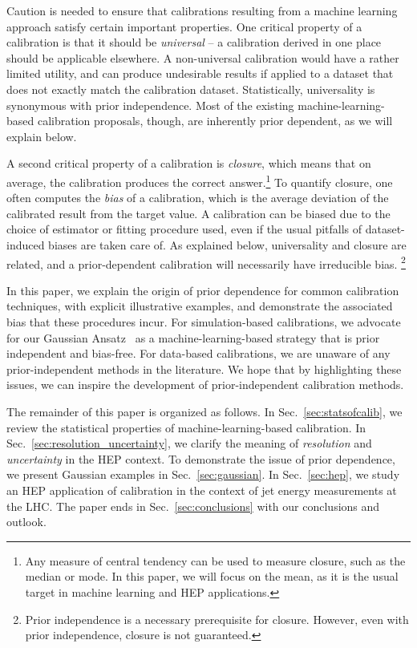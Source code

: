 \documentclass[aps,prd,reprint,preprintnumbers,superscriptaddress,nofootinbib,longbibliography,floatfix]{revtex4-1}
\DeclareRobustCommand{\Sec}[1]{Sec.~\ref{sec:#1}}
\begin{document}
Caution is needed to ensure that calibrations resulting from a machine learning approach satisfy certain important properties.
%
One critical property of a calibration is that it should be \textit{universal} -- a calibration derived in one place should be applicable elsewhere.
%
A non-universal calibration would have a rather limited utility, and can produce undesirable results if applied to a dataset that does not exactly match the calibration dataset.
%
Statistically, universality is synonymous with prior independence.
%
Most of the existing machine-learning-based calibration proposals, though, are inherently prior dependent, as we will explain below.


A second critical property of a calibration is \textit{closure}, which means that on average, the calibration produces the correct answer.\footnote{Any measure of central tendency can be used to measure closure, such as the median or mode. In this paper, we will focus on the mean, as it is the usual target in machine learning and HEP applications.}
%
To quantify closure, one often computes the \emph{bias} of a calibration, which is the average deviation of the calibrated result from the target value.
% 
A calibration can be biased due to the choice of estimator or fitting procedure used, even if the usual pitfalls of dataset-induced biases are taken care of.
%
As explained below, universality and closure are related, and a prior-dependent calibration will necessarily have irreducible bias.%
%
\footnote{Prior independence is a necessary prerequisite for closure. However, even with prior independence, closure is not guaranteed.}



In this paper, we explain the origin of prior dependence for common calibration techniques, with explicit illustrative examples, and demonstrate the associated bias that these procedures incur.
%
For simulation-based calibrations, we advocate for our Gaussian Ansatz~\cite{frequentstway} as a machine-learning-based strategy that is prior independent and bias-free.
%
For data-based calibrations, we are unaware of any prior-independent methods in the literature.
%
We hope that by highlighting these issues, we can inspire the development of prior-independent calibration methods.


The remainder of this paper is organized as follows.
%
In \Sec{statsofcalib}, we review the statistical properties of machine-learning-based calibration.
%
In \Sec{resolution_uncertainty}, we clarify the meaning of \textit{resolution} and \textit{uncertainty} in the HEP context.
%
To demonstrate the issue of prior dependence, we present Gaussian examples in \Sec{gaussian}.
%
In \Sec{hep}, we study an HEP application of calibration in the context of jet energy measurements at the LHC.
%
The paper ends in \Sec{conclusions} with our conclusions and outlook.
\end{document}
